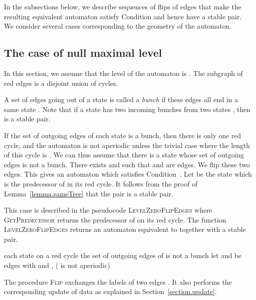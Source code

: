 \documentclass[11pt,a4paper]{article}
\begin{document}
In the subsections below, we describe sequences of flips of edges
that make the resulting equivalent automaton satisfy Condition 
and hence have a stable pair. We consider several cases corresponding
to the geometry of the automaton. 


\subsection{The case of null maximal level}

In this section, we assume that the level of the automaton is . The subgraph  of red edges is a disjoint union of cycles.  

A set of edges going out of a state  is called a \emph{bunch} if
these edges all end in a same state . Note that if a state  has
two incoming bunches from two states , then  is a
stable pair.

If the set of outgoing edges of each state is a bunch, then there is
only one red cycle, and the automaton is not aperiodic unless the
trivial case where the length of this cycle is . We can thus assume
that there is a state  whose set of outgoing edges is not a
bunch. There exists  and  such that  and
 are edges. We flip these two edges. This gives an automaton 
which satisfies Condition~.  Let  be the state which is the
predecessor of  in its red cycle.  It follows from the proof of
Lemma~\ref{lemma.sameTree} that the pair  is a stable pair.

This case is described in the pseudocode \textsc{LevelZeroFlipEdges}
where \textsc{GetPredecessor} returns the predecessor of  on its red cycle.  The function \textsc{LevelZero\-FlipEdges}
returns an automaton equivalent to  together with a stable pair.

\begin{small} 
\begin{codebox}
\Procname{)}
\li    \For each state   on a red cycle      
\li        \Do \If the set of outgoing edges of  is not a bunch
\li                \Then  let  and  be edges with  and 
\li                       {}
\li                        {}
\li                      \Return , 
               \End
       \End 
\li    \Return {}( is not aperiodic)  
\end{codebox}
\end{small}

The procedure \textsc{Flip}
exchanges the labels of two edges . It also performs the corresponding update of data as explained in Section~\ref{section.update}. 
\end{document}
